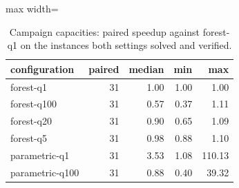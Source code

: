 \begin{table}[tbp]
\centering
\caption{Campaign capacities: paired speedup against forest-q1 on the instances both settings solved and verified.}
\label{tab:capacities-speedup}
\small
\begin{adjustbox}{max width=\textwidth}
\begin{tabular}{lrrrr}
\toprule
configuration & paired & median & min & max \\
\midrule
forest-q1 & 31 & 1.00 & 1.00 & 1.00 \\
forest-q100 & 31 & 0.57 & 0.37 & 1.11 \\
forest-q20 & 31 & 0.90 & 0.65 & 1.09 \\
forest-q5 & 31 & 0.98 & 0.88 & 1.10 \\
parametric-q1 & 31 & 3.53 & 1.08 & 110.13 \\
parametric-q100 & 31 & 0.88 & 0.40 & 39.32 \\
\bottomrule
\end{tabular}
\end{adjustbox}
\end{table}
